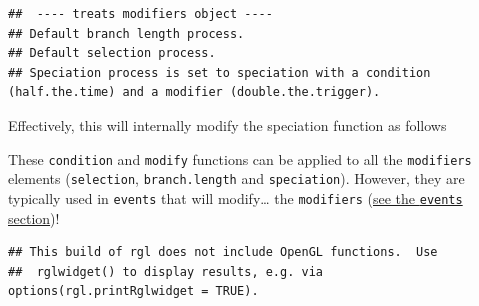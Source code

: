 \documentclass[
]{book}
\newenvironment{Shaded}{\begin{snugshade}}{\end{snugshade}}
\newcommand{\CommentTok}[1]{\textcolor[rgb]{0.56,0.35,0.01}{\textit{#1}}}
\newcommand{\ControlFlowTok}[1]{\textcolor[rgb]{0.13,0.29,0.53}{\textbf{#1}}}
\newcommand{\DecValTok}[1]{\textcolor[rgb]{0.00,0.00,0.81}{#1}}
\newcommand{\KeywordTok}[1]{\textcolor[rgb]{0.13,0.29,0.53}{\textbf{#1}}}
\newcommand{\NormalTok}[1]{#1}
\newcommand{\OperatorTok}[1]{\textcolor[rgb]{0.81,0.36,0.00}{\textbf{#1}}}
\newcommand{\StringTok}[1]{\textcolor[rgb]{0.31,0.60,0.02}{#1}}
\begin{document}
\begin{verbatim}
##  ---- treats modifiers object ---- 
## Default branch length process.
## Default selection process.
## Speciation process is set to speciation with a condition (half.the.time) and a modifier (double.the.trigger).
\end{verbatim}

Effectively, this will internally modify the speciation function as follows

\begin{Shaded}
\end{Shaded}

These \texttt{condition} and \texttt{modify} functions can be applied to all the \texttt{modifiers} elements (\texttt{selection}, \texttt{branch.length} and \texttt{speciation}).
However, they are typically used in \texttt{events} that will modify\ldots{} the \texttt{modifiers} (\protect\hyperlink{makeevents}{see the \texttt{events} section})!

\begin{verbatim}
## This build of rgl does not include OpenGL functions.  Use
##  rglwidget() to display results, e.g. via options(rgl.printRglwidget = TRUE).
\end{verbatim}
\end{document}
